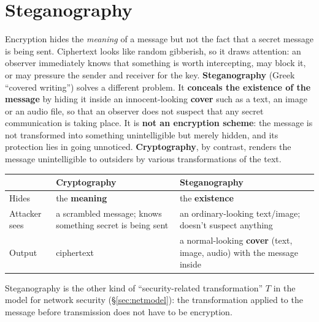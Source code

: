 
\section{Steganography}\label{sec:stego}
Encryption hides the \emph{meaning} of a message but not the fact that a secret message is being sent. Ciphertext looks like random gibberish, so it draws attention: an observer immediately knows that something is worth intercepting, may block it, or may pressure the sender and receiver for the key. \textbf{Steganography} (Greek ``covered writing'') solves a different problem. It \textbf{conceals the existence of the message} by hiding it inside an innocent-looking \textbf{cover} such as a text, an image or an audio file, so that an observer does not suspect that any secret communication is taking place. It is \textbf{not an encryption scheme}: the message is not transformed into something unintelligible but merely hidden, and its protection lies in going unnoticed. \textbf{Cryptography}, by contrast, renders the message unintelligible to outsiders by various transformations of the text.

\begin{center}\small
\begin{tabularx}{\textwidth}{@{}l X X@{}}
\toprule
 & \textbf{Cryptography} & \textbf{Steganography}\\
\midrule
Hides & the \textbf{meaning} & the \textbf{existence}\\
Attacker sees & a scrambled message; knows something secret is being sent & an ordinary-looking text/image; doesn't suspect anything\\
Output & ciphertext & a normal-looking \textbf{cover} (text, image, audio) with the message inside\\
\bottomrule
\end{tabularx}
\end{center}
Steganography is the other kind of ``security-related transformation'' $T$ in the model for network security (\S\ref{sec:netmodel}): the transformation applied to the message before transmission does not have to be encryption.

